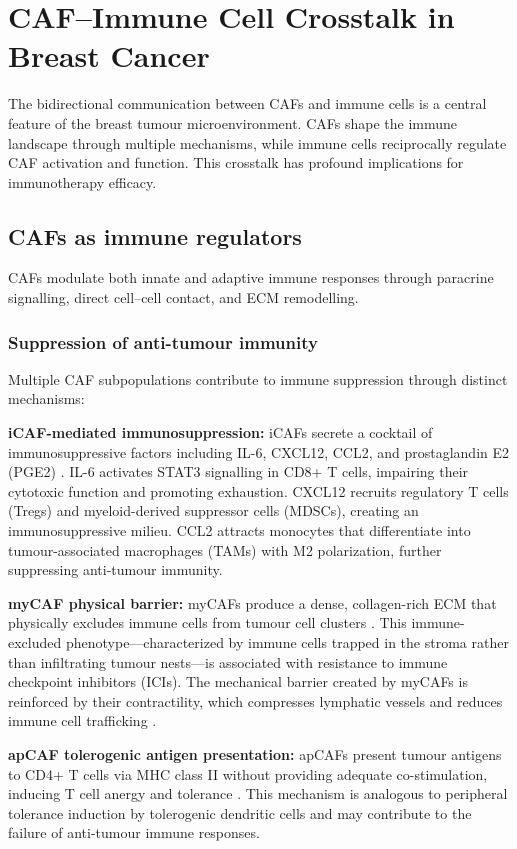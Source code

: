 \section{CAF--Immune Cell Crosstalk in Breast Cancer}
\label{sec:immune}

The bidirectional communication between CAFs and immune cells is a central feature of the breast tumour microenvironment. CAFs shape the immune landscape through multiple mechanisms, while immune cells reciprocally regulate CAF activation and function. This crosstalk has profound implications for immunotherapy efficacy.

\subsection{CAFs as immune regulators}

CAFs modulate both innate and adaptive immune responses through paracrine signalling, direct cell--cell contact, and ECM remodelling.

\subsubsection{Suppression of anti-tumour immunity}

Multiple CAF subpopulations contribute to immune suppression through distinct mechanisms:

\textbf{iCAF-mediated immunosuppression:} iCAFs secrete a cocktail of immunosuppressive factors including IL-6, CXCL12, CCL2, and prostaglandin E2 (PGE2) \citep{erve2024}. IL-6 activates STAT3 signalling in CD8+ T cells, impairing their cytotoxic function and promoting exhaustion. CXCL12 recruits regulatory T cells (Tregs) and myeloid-derived suppressor cells (MDSCs), creating an immunosuppressive milieu. CCL2 attracts monocytes that differentiate into tumour-associated macrophages (TAMs) with M2 polarization, further suppressing anti-tumour immunity.

\textbf{myCAF physical barrier:} myCAFs produce a dense, collagen-rich ECM that physically excludes immune cells from tumour cell clusters \citep{chhabra2023}. This immune-excluded phenotype---characterized by immune cells trapped in the stroma rather than infiltrating tumour nests---is associated with resistance to immune checkpoint inhibitors (ICIs). The mechanical barrier created by myCAFs is reinforced by their contractility, which compresses lymphatic vessels and reduces immune cell trafficking \citep{fan2023}.

\textbf{apCAF tolerogenic antigen presentation:} apCAFs present tumour antigens to CD4+ T cells via MHC class II without providing adequate co-stimulation, inducing T cell anergy and tolerance \citep{erve2024}. This mechanism is analogous to peripheral tolerance induction by tolerogenic dendritic cells and may contribute to the failure of anti-tumour immune responses.

